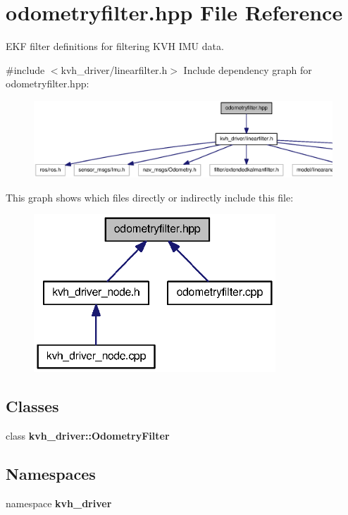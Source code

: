 \section{odometryfilter.\-hpp \-File \-Reference}
\label{odometryfilter_8hpp}


\-E\-K\-F filter definitions for filtering \-K\-V\-H \-I\-M\-U data.  


{\ttfamily \#include $<$kvh\-\_\-driver/linearfilter.\-h$>$}\*
\-Include dependency graph for odometryfilter.\-hpp\-:
\nopagebreak
\begin{figure}[H]
\begin{center}
\leavevmode
\includegraphics[width=350pt]{odometryfilter_8hpp__incl}
\end{center}
\end{figure}
\-This graph shows which files directly or indirectly include this file\-:\nopagebreak
\begin{figure}[H]
\begin{center}
\leavevmode
\includegraphics[width=257pt]{odometryfilter_8hpp__dep__incl}
\end{center}
\end{figure}
\subsection*{\-Classes}
\begin{DoxyCompactItemize}
\item 
class {\bf kvh\-\_\-driver\-::\-Odometry\-Filter}
\end{DoxyCompactItemize}
\subsection*{\-Namespaces}
\begin{DoxyCompactItemize}
\item 
namespace {\bf kvh\-\_\-driver}
\end{DoxyCompactItemize}


